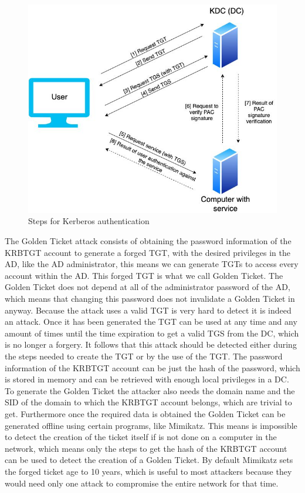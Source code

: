 \begin{figure}[H]
	\label{kerberos_exchange}
	\centering
	\includegraphics[width=.8\textwidth]{figuras/TGT_TGS_PAC.jpg}
	\caption{Steps for Kerberos authentication}
\end{figure}
\linej
The Golden Ticket attack consists of obtaining the password information of the KRBTGT account to generate a forged TGT, with the desired privileges in the AD, like the AD administrator, this means we can generate TGTs to access every account within the AD. This forged TGT is what we call Golden Ticket.
\linej
The Golden Ticket does not depend at all of the administrator password of the AD, which means that changing this password does not invalidate a Golden Ticket in anyway.
\linej
\linej
Because the attack uses a valid TGT is very hard to detect it is indeed an attack. Once it has been generated the TGT can be used at any time and any amount of times until the time expiration to get a valid TGS from the DC, which is no longer a forgery.
\linej
It follows that this attack should be detected either during the steps needed to create the TGT or by the use of the TGT.
\linej
\linej
The password information of the KRBTGT account can be just the hash of the password, which is stored in memory and can be retrieved with enough local privileges in a DC. To generate the Golden Ticket the attacker also needs the domain name and the SID of the domain to which the KRBTGT account belongs, which are trivial to get\cite{stealthbits}.
\linej
Furthermore once the required data is obtained the Golden Ticket can be generated offline using certain programs, like Mimikatz. This means is impossible to detect the creation of the ticket itself if is not done on a computer in the network, which means only the steps to get the hash of the KRBTGT account can be used to detect the creation of a Golden Ticket.
\linej
\linej
By default Mimikatz sets the forged ticket age to 10 years, which is useful to most attackers because they would need only one attack to compromise the entire network for that time.

